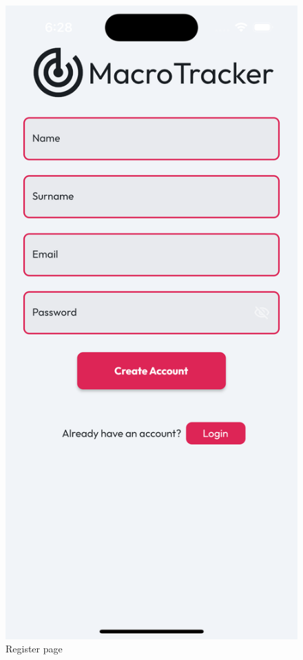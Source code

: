 \documentclass{Configuration_Files/PoliMi3i_thesis}
\begin{document}
\begin{figure}[!h]
  \includegraphics[scale=0.1]{Images/Screenshots/Mobile/RegisterLight.png}
  \caption{Register page}
\end{figure}

\clearpage
\end{document}
